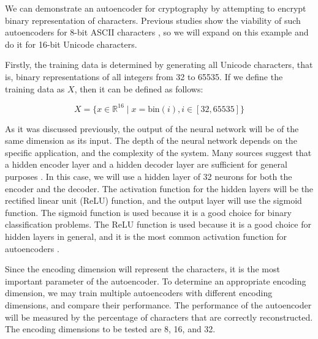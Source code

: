 We can demonstrate an autoencoder for cryptography by attempting to encrypt binary representation of characters. Previous studies show the viability of such autoencoders for 8-bit ASCII characters \cite{icaart20}, so we will expand on this example and do it for 16-bit Unicode characters.

Firstly, the training data is determined by generating all Unicode characters, that is, binary representations of all integers from 32 to 65535. If we define the training data as $X$, then it can be defined as follows:

\begin{equation}
    X = \{x \in \mathbb{R}^{16} \mid x = \text{bin}(i), i \in [32, 65535]\}
\end{equation}

As it was discussed previously, the output of the neural network will be of the same dimension as its input. The depth of the neural network depends on the specific application, and the complexity of the system. Many sources suggest that a hidden encoder layer and a hidden decoder layer are sufficient for general purposes \cite{autoencoder2}. In this case, we will use a hidden layer of 32 neurons for both the encoder and the decoder. The activation function for the hidden layers will be the rectified linear unit (ReLU) function, and the output layer will use the sigmoid function. The sigmoid function is used because it is a good choice for binary classification problems. The ReLU function is used because it is a good choice for hidden layers in general, and it is the most common activation function for autoencoders \cite{autoencoder3}.

Since the encoding dimension will represent the characters, it is the most important parameter of the autoencoder. To determine an appropriate encoding dimension, we may train multiple autoencoders with different encoding dimensions, and compare their performance. The performance of the autoencoder will be measured by the percentage of characters that are correctly reconstructed. The encoding dimensions to be tested are 8, 16, and 32.

